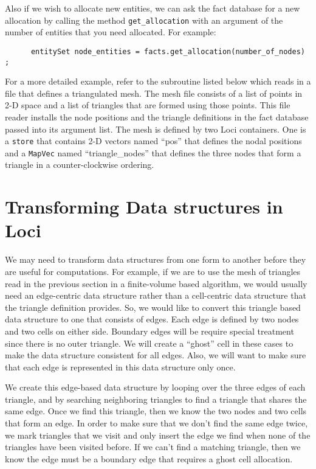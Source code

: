 \documentclass[10pt,epsf]{book}
\begin{document}
Also if we wish to allocate new entities, we can ask the fact database
for a new allocation by calling the method {\tt get\_allocation} with
an argument of the number of entities that you need allocated.  For
example:
\begin{verbatim}
      entitySet node_entities = facts.get_allocation(number_of_nodes) ;
\end{verbatim}

For a more detailed example, refer to the subroutine listed below
which reads in a file that defines a triangulated mesh.  The mesh file
consists of a list of points in 2-D space and a list of triangles that
are formed using those points.  This file reader installs the node
positions and the triangle definitions in the fact database passed
into its argument list.  The mesh is defined by two Loci containers.
One is a {\tt store} that contains 2-D vectors named ``pos'' that
defines the nodal positions and a {\tt MapVec} named
``triangle\_nodes'' that defines the three nodes that form a triangle
in a counter-clockwise ordering.



\section{Transforming Data structures in Loci}

We may need to transform data structures from one form to another
before they are useful for computations.  For example, if we are
to use the mesh of triangles read in the previous section in a
finite-volume based algorithm, we would usually need an edge-centric
data structure rather than a cell-centric data structure that the
triangle definition provides.  So, we would like to convert this
triangle based data structure to one that consists of edges.  Each
edge is defined by two nodes and two cells on either side.  Boundary
edges will be require special treatment since there is no outer
triangle.  We will create a ``ghost'' cell in these cases to make the
data structure consistent for all edges.  Also, we will want to make
sure that each edge is represented in this data structure only once.

We create this edge-based data structure by looping over the three
edges of each triangle, and by searching neighboring triangles to find a
triangle that shares the same edge.  Once we find this triangle, then
we know the two nodes and two cells that form an edge.  In order to
make sure that we don't find the same edge twice, we mark triangles
that we visit and only insert the edge we find when none of the
triangles have been visited before.  If we can't find a matching
triangle, then we know the edge must be a boundary edge that requires
a ghost cell allocation.
\end{document}
